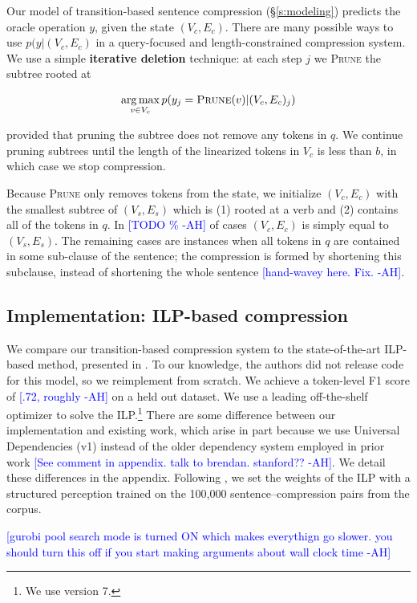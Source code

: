 \documentclass[11pt,a4paper]{article}
\newcommand{\ahcomment}[1]{\textcolor{blue}{[#1 -AH]}}
\DeclareMathOperator*{\argmaxA}{arg\,max} %
\begin{document}
Our model of transition-based sentence compression (\S\ref{s:modeling}) predicts the oracle operation $y$, given the state $(V_c, E_c)$. There are many possible ways to use $p(y|(V_c, E_c)$ in a query-focused and length-constrained compression system. We use a simple \textbf{iterative deletion} technique: at each step $j$ we \textsc{Prune} the subtree rooted at 

$$\argmaxA_{v \in V_c}   p(y_j = \textsc{Prune}(v) | (V_c, E_c)_j)$$

\noindent provided that pruning the subtree does not remove any tokens in $q$. We continue pruning subtrees until the length of the linearized tokens in $V_c$ is less than $b$, in which case we stop compression. 

Because \textsc{Prune} only removes tokens from the state, we initialize $(V_c, E_c)$ with the smallest subtree of $(V_s, E_s)$ which is (1) rooted at a verb and (2) contains all of the tokens in $q$. In \ahcomment{TODO \%} of cases $(V_c, E_c)$ is simply equal to $(V_s, E_s)$. The remaining cases are instances when all tokens in $q$ are contained in some sub-clause of the sentence; the compression is formed by shortening this subclause, instead of shortening the whole sentence \ahcomment{hand-wavey here. Fix.}. 

\subsection{Implementation: ILP-based compression}\label{s:ilp}

We compare our transition-based compression system to the state-of-the-art ILP-based method, presented in \citet{filippova2013overcoming}. To our knowledge, the authors did not release code for this model, so we reimplement from scratch. We achieve a token-level F1 score of \ahcomment{.72, roughly} on a held out dataset. We use a leading off-the-shelf optimizer \cite{gurobi} to solve the ILP.\footnote{We use version 7.} There are some difference between our implementation and existing work, which arise in part because we use Universal Dependencies (v1) instead of the older dependency system employed in prior work \ahcomment{See comment in appendix. talk to brendan. stanford??}. We detail these differences in the appendix. Following \citet{filippova2013overcoming}, we set the weights of the ILP with a structured perception trained on the 100,000 sentence--compression pairs from the corpus.

\ahcomment{gurobi pool search mode is turned ON which makes everythign go slower. you should turn this off if you start making arguments about wall clock time}
\end{document}
